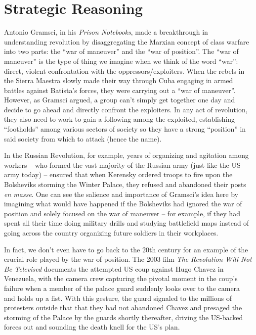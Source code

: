 \section{Strategic Reasoning}

Antonio Gramsci, in his \textit{Prison Notebooks}, made a breakthrough in understanding revolution by disaggregating the Marxian concept of class warfare into two parts: the ``war of maneuver'' and the ``war of position''. The ``war of maneuver'' is the type of thing we imagine when we think of the word ``war'': direct, violent confrontation with the oppressors/exploiters. When the rebels in the Sierra Maestra slowly made their way through Cuba engaging in armed battles against Batista's forces, they were carrying out a ``war of maneuver''. However, as Gramsci argued, a group can't simply get together one day and decide to go ahead and directly confront the exploiters. In any act of revolution, they also need to work to gain a following among the exploited, establishing ``footholds'' among various sectors of society so they have a strong ``position'' in said society from which to attack (hence the name).

In the Russian Revolution, for example, years of organizing and agitation among workers -- who formed the vast majority of the Russian army (just like the US army today) -- ensured that when Kerensky ordered troops to fire upon the Bolsheviks storming the Winter Palace, they refused and abandoned their posts \textit{en masse}. One can see the salience and importance of Gramsci's idea here by imagining what would have happened if the Bolsheviks had ignored the war of position and solely focused on the war of maneuver -- for example, if they had spent all their time doing military drills and studying battlefield maps instead of going across the country organizing future soldiers in their workplaces.

In fact, we don't even have to go back to the 20th century for an example of the crucial role played by the war of position. The 2003 film \textit{The Revolution Will Not Be Televised} documents the attempted US coup against Hugo Chavez in Venezuela, with the camera crew capturing the pivotal moment in the coup's failure when a member of the palace guard suddenly looks over to the camera and holds up a fist. With this gesture, the guard signaled to the millions of protesters outside that that they had not abandoned Chavez and presaged the storming of the Palace by the guards shortly thereafter, driving the US-backed forces out and sounding the death knell for the US's plan.

